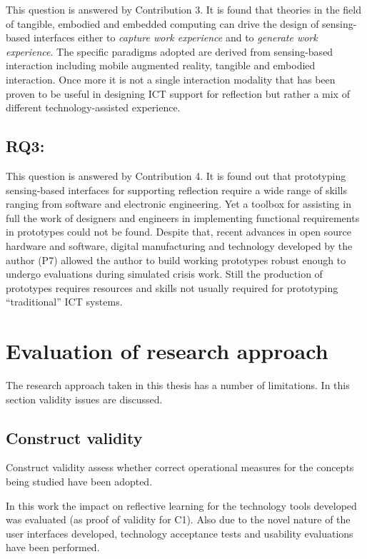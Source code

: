 This question is answered by Contribution 3. It is found that theories in the field of tangible, embodied and embedded computing can drive the design of sensing-based interfaces either to \emph{capture work experience} and to \emph{generate work experience}. The specific paradigms adopted are derived from sensing-based interaction including mobile augmented reality, tangible and embodied interaction. Once more it is not a single interaction modality that has been proven to be useful in designing ICT support for reflection but rather a mix of different technology-assisted experience.

\subsection{RQ3: \RQiii}\label{rq3}

This question is answered by Contribution 4. It is found out that prototyping sensing-based interfaces for supporting reflection require a wide range of skills ranging from software and electronic engineering. Yet a toolbox for assisting in full the work of designers and engineers in implementing functional requirements in prototypes could not be found. Despite that, recent advances in open source hardware and software, digital manufacturing and technology developed by the author (P7) allowed the author to build working prototypes robust enough to undergo evaluations during simulated crisis work. Still the production of prototypes requires resources and skills not usually required for prototyping ``traditional'' ICT systems.

\section{Evaluation of research approach}\label{evaluation-of-research-approach}

The research approach taken in this thesis has a number of limitations. In this section validity issues \autocite{yin2013case} are discussed.

\subsection{Construct validity}\label{construct-validity}

Construct validity assess whether correct operational measures for the concepts being studied have been adopted.

In this work the impact on reflective learning for the technology tools developed was evaluated (as proof of validity for C1). Also due to the novel nature of the user interfaces developed, technology acceptance tests and usability evaluations have been performed.

